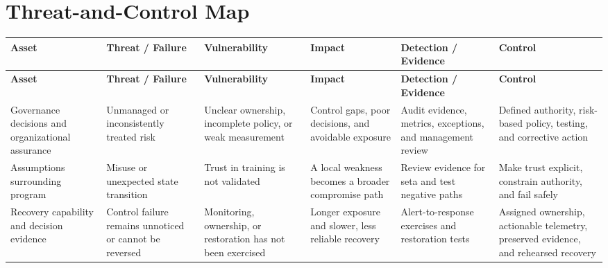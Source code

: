 \documentclass[11pt]{article}
\begin{document}
\section*{Threat-and-Control Map}
\begingroup\scriptsize\setlength{\tabcolsep}{2pt}
\begin{longtable}{>{\RaggedRight\arraybackslash}p{}>{\RaggedRight\arraybackslash}p{}>{\RaggedRight\arraybackslash}p{}>{\RaggedRight\arraybackslash}p{}>{\RaggedRight\arraybackslash}p{}>{\RaggedRight\arraybackslash}p{}}
\toprule\rowcolor{Navy}\color{white}\textbf{Asset} & \color{white}\textbf{Threat / Failure} & \color{white}\textbf{Vulnerability} & \color{white}\textbf{Impact} & \color{white}\textbf{Detection / Evidence} & \color{white}\textbf{Control}\\\midrule
\endfirsthead
\toprule\rowcolor{Navy}\color{white}\textbf{Asset} & \color{white}\textbf{Threat / Failure} & \color{white}\textbf{Vulnerability} & \color{white}\textbf{Impact} & \color{white}\textbf{Detection / Evidence} & \color{white}\textbf{Control}\\\midrule
\endhead
Governance decisions and organizational assurance & Unmanaged or inconsistently treated risk & Unclear ownership, incomplete policy, or weak measurement & Control gaps, poor decisions, and avoidable exposure & Audit evidence, metrics, exceptions, and management review & Defined authority, risk-based policy, testing, and corrective action\\\midrule
Assumptions surrounding program & Misuse or unexpected state transition & Trust in training is not validated & A local weakness becomes a broader compromise path & Review evidence for seta and test negative paths & Make trust explicit, constrain authority, and fail safely\\\midrule
Recovery capability and decision evidence & Control failure remains unnoticed or cannot be reversed & Monitoring, ownership, or restoration has not been exercised & Longer exposure and slower, less reliable recovery & Alert-to-response exercises and restoration tests & Assigned ownership, actionable telemetry, preserved evidence, and rehearsed recovery\\\midrule
\bottomrule
\end{longtable}
\endgroup
\end{document}
